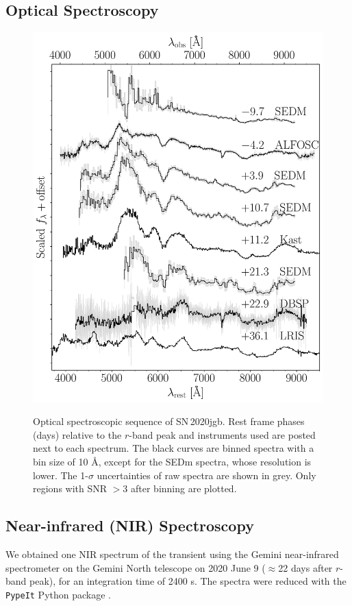 \documentclass[twocolumn]{aastex631}
\newcommand\sn{SN\,2020jgb}
\begin{document}
\subsection{Optical Spectroscopy}

\begin{figure}
    \centering
    \includegraphics[width=\linewidth]{optical_spec_evolution.pdf}
    \label{fig:spec_evo}
    \caption{Optical spectroscopic sequence of \sn. Rest frame phases (days) relative to the $r$-band peak and instruments used are posted next to each spectrum. The black curves are binned spectra with a bin size of 10 \r{A}, except for the SEDm spectra, whose resolution is lower. The 1-$\sigma$ uncertainties of raw spectra are shown in grey. Only regions with SNR $>3$ after binning are plotted.} %
\end{figure}

\subsection{Near-infrared (NIR) Spectroscopy}
We obtained one NIR spectrum of the transient using the Gemini near-infrared spectrometer \citep[GNIRS;][]{GNIRS1998} on the Gemini North telescope on 2020 June 9 ($\approx$22 days after $r$-band peak), for an integration time of 2400 s. The spectra were reduced with the \texttt{PypeIt} Python package \citep{pypeit:joss_pub,pypeit:zenodo}.
\end{document}
